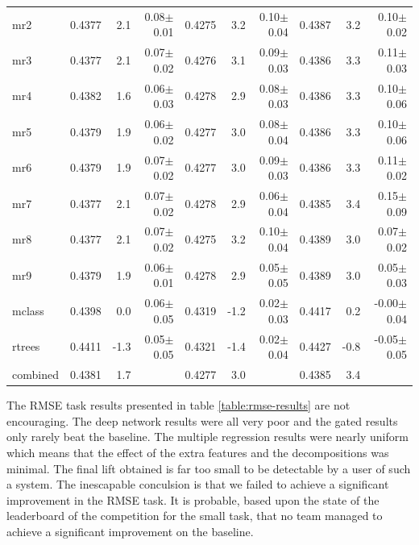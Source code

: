 \documentclass{article}
\begin{document}
\begin{table}[t]
\begin{center}
\begin{small}
\begin{sc}
\begin{tabular}{l|rr r|rr r|rr r}
mr2        & 0.4377 &   2.1 &  0.08$\pm$0.01& 0.4275 &   3.2 &  0.10$\pm$0.04& 0.4387 &   3.2 &  0.10$\pm$0.02 \\ 
mr3        & 0.4377 &   2.1 &  0.07$\pm$0.02& 0.4276 &   3.1 &  0.09$\pm$0.03& 0.4386 &   3.3 &  0.11$\pm$0.03 \\ 
mr4        & 0.4382 &   1.6 &  0.06$\pm$0.03& 0.4278 &   2.9 &  0.08$\pm$0.03& 0.4386 &   3.3 &  0.10$\pm$0.06 \\ 
mr5        & 0.4379 &   1.9 &  0.06$\pm$0.02& 0.4277 &   3.0 &  0.08$\pm$0.04& 0.4386 &   3.3 &  0.10$\pm$0.06 \\ 
mr6        & 0.4379 &   1.9 &  0.07$\pm$0.02& 0.4277 &   3.0 &  0.09$\pm$0.03& 0.4386 &   3.3 &  0.11$\pm$0.02 \\ 
mr7        & 0.4377 &   2.1 &  0.07$\pm$0.02& 0.4278 &   2.9 &  0.06$\pm$0.04& 0.4385 &   3.4 &  0.15$\pm$0.09 \\ 
mr8        & 0.4377 &   2.1 &  0.07$\pm$0.02& 0.4275 &   3.2 &  0.10$\pm$0.04& 0.4389 &   3.0 &  0.07$\pm$0.02 \\ 
mr9        & 0.4379 &   1.9 &  0.06$\pm$0.01& 0.4278 &   2.9 &  0.05$\pm$0.05& 0.4389 &   3.0 &  0.05$\pm$0.03 \\ 
\abovespace
mclass     & 0.4398 &   0.0 &  0.06$\pm$0.05& 0.4319 &  -1.2 &  0.02$\pm$0.03& 0.4417 &   0.2 & -0.00$\pm$0.04 \\ 
rtrees     & 0.4411 &  -1.3 &  0.05$\pm$0.05& 0.4321 &  -1.4 &  0.02$\pm$0.04& 0.4427 &  -0.8 & -0.05$\pm$0.05 \\ 
\abovespace\belowspace
combined   & 0.4381 &   1.7 &  & 0.4277 &   3.0 &  & 0.4385 &   3.4 &   \\ 
\hline
\end{tabular}
\end{sc}
\end{small}
\end{center}
\vskip -0.1in
\end{table}

The RMSE task results presented in table \ref{table:rmse-results} are not encouraging.  The deep network results were all very poor and the gated results only rarely beat the baseline.  The multiple regression results were nearly uniform which means that the effect of the extra features and the decompositions was minimal.  The final lift obtained is far too small to be detectable by a user of such a system.  The inescapable conculsion is that we failed to achieve a significant improvement in the RMSE task.  It is probable, based upon the state of the leaderboard of the competition for the small task, that no team managed to achieve a significant improvement on the baseline.
\end{document}
